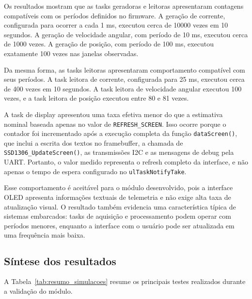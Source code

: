 \documentclass[a4paper,10pt]{article}
\begin{document}
Os resultados mostram que as tasks geradoras e leitoras apresentaram contagens compatíveis com os períodos definidos no firmware. A geração de corrente, configurada para ocorrer a cada 1 ms, executou cerca de 10000 vezes em 10 segundos. A geração de velocidade angular, com período de 10 ms, executou cerca de 1000 vezes. A geração de posição, com período de 100 ms, executou exatamente 100 vezes nas janelas observadas.

Da mesma forma, as tasks leitoras apresentaram comportamento compatível com seus períodos. A task leitora de corrente, configurada para 25 ms, executou cerca de 400 vezes em 10 segundos. A task leitora de velocidade angular executou 100 vezes, e a task leitora de posição executou entre 80 e 81 vezes.

A task de display apresentou uma taxa efetiva menor do que a estimativa nominal baseada apenas no valor de \texttt{REFRESH\_SCREEN}. Isso ocorre porque o contador foi incrementado após a execução completa da função \texttt{dataScreen()}, que inclui a escrita dos textos no framebuffer, a chamada de \texttt{SSD1306\_UpdateScreen()}, as transmissões I2C e as mensagens de debug pela UART. Portanto, o valor medido representa o refresh completo da interface, e não apenas o tempo de espera configurado no \texttt{ulTaskNotifyTake}.

Esse comportamento é aceitável para o módulo desenvolvido, pois a interface OLED apresenta informações textuais de telemetria e não exige alta taxa de atualização visual. O resultado também evidencia uma característica típica de sistemas embarcados: tasks de aquisição e processamento podem operar com períodos menores, enquanto a interface com o usuário pode ser atualizada em uma frequência mais baixa.

\subsection{Síntese dos resultados}

A Tabela~\ref{tab:resumo_simulacoes} resume os principais testes realizados durante a validação do módulo.
\end{document}
